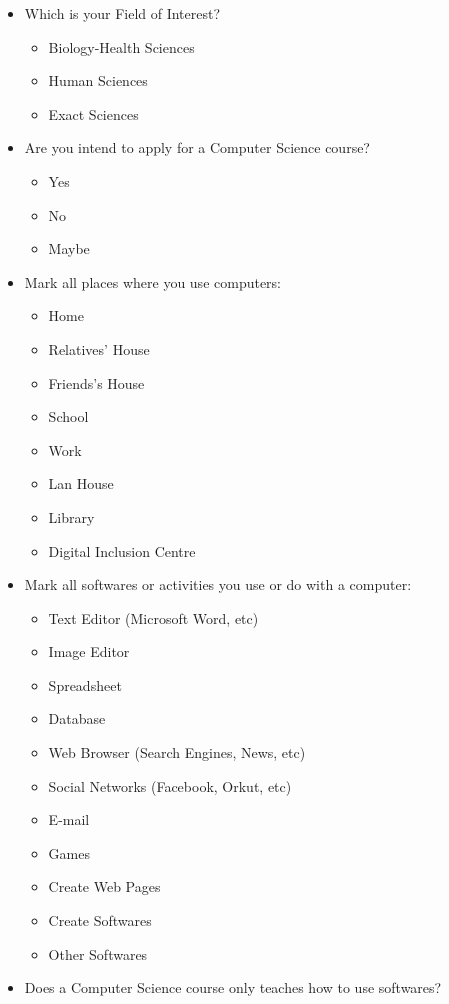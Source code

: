 \begin{itemize}
	\item Which is your Field of Interest?
		\begin{itemize}
			\item Biology-Health Sciences 
			\item Human Sciences
			\item Exact Sciences	
		\end{itemize}
	\item Are you intend to apply for a Computer Science course?
		\begin{itemize}
			\item Yes
			\item No
			\item Maybe
		\end{itemize}
	\item Mark all places where you use computers:
		\begin{itemize}
			\item Home
			\item Relatives' House
			\item Friends's House
			\item School
			\item Work
			\item Lan House
			\item Library
			\item Digital Inclusion Centre
		\end{itemize}
	\item Mark all softwares or activities you use or do with  a computer:
		\begin{itemize}
			\item Text Editor (Microsoft Word, etc)
			\item Image Editor
			\item Spreadsheet
			\item Database
			\item Web Browser (Search Engines, News, etc)
			\item Social Networks (Facebook, Orkut, etc)
			\item E-mail
			\item Games
			\item Create Web Pages
			\item Create Softwares
			\item Other Softwares
		\end{itemize}
	\item Does a Computer Science course only teaches how to use softwares?

\end{itemize}
